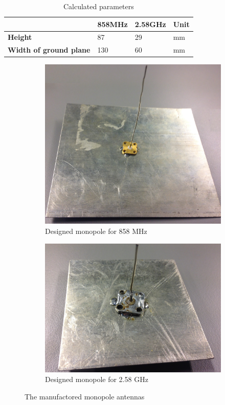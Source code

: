 \begin{table}[H]
\centering
\begin{tabular}{l|lll}
                				& \textbf{858MHz} 	& \textbf{2.58GHz} 	& \textbf{Unit} \\\hline
\textbf{Height}  				& 87           		& 29            	& mm            \\
\textbf{Width of ground plane} 	& 130            	& 60            	& mm 
\end{tabular}
\caption{Calculated parameters}
\label{tab:parameters}
\end{table}


\begin{figure}[H]
\captionsetup{belowskip=0em}
\begin{subfigure}[b]{0.48\textwidth}
\includegraphics[width=\textwidth]{figure/IMG_0918.jpg}
\caption{Designed monopole for 858 MHz}
\label{fig:868Patch}
\end{subfigure}
\begin{subfigure}[b]{0.48\textwidth}
\includegraphics[width=\textwidth]{figure/IMG_0919.jpg}
\caption{Designed monopole for 2.58 GHz}
\label{fig:2.4Patch}
\end{subfigure}
\captionsetup{belowskip=-1.5em}
\caption{The manufactored monopole antennas}
\end{figure}